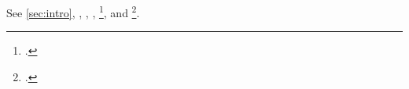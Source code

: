 \documentclass[unicode]{wrapper}
\begin{document}
\tableofcontents
\wrapperclass\articleclass\layoutmode\hyperdriver\hyperxmploaded\shimready

See \cref{sec:intro}, , \autocite{alpha}, \autocites[see][chap.~2]{alpha}[cf.][pp.~1--2]{beta}, \footcite{beta}, and \footcites{alpha}[cf.]{beta}.
\end{document}
